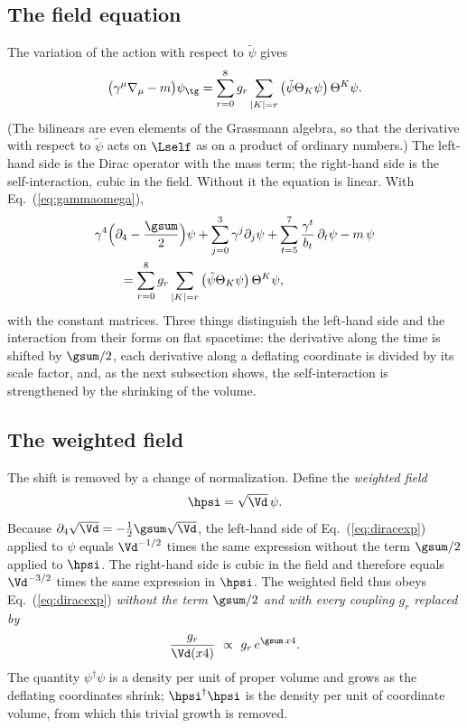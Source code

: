 \subsection{The field equation}

The variation of the action with respect to $\tilde\psi$ gives
\begin{equation}
\big(\gamma^{\mu}\nabla_\mu-m\big)\psi_{\tg}=\sum_{r=0}^{8}g_r\sum_{|K|=r}\big(\tilde\psi\Theta_K\psi\big)\,\Theta^{K}\psi .
\label{eq:dirac}
\end{equation}
(The bilinears are even elements of the Grassmann algebra, so that the derivative with respect to
$\tilde\psi$ acts on $\Lself$ as on a product of ordinary numbers.) The left-hand side is the Dirac
operator with the mass term; the right-hand side is the self-interaction, cubic in the field.
Without it the equation is linear. With Eq.~(\ref{eq:gammaomega}),
\begin{equation}
\begin{aligned}
&\gamma^{4}\Big(\partial_4-\frac{\gsum}{2}\Big)\psi+\sum_{j=0}^{3}\gamma^{j}\partial_j\psi
+\sum_{t=5}^{7}\frac{\gamma^{t}}{b_t}\,\partial_t\psi-m\,\psi\\
&\qquad=\sum_{r=0}^{8}g_r\sum_{|K|=r}\big(\tilde\psi\Theta_K\psi\big)\,\Theta^{K}\psi,
\end{aligned}
\label{eq:diracexp}
\end{equation}
with the constant matrices. Three things distinguish the left-hand side and the interaction from
their forms on flat spacetime: the derivative along the time is shifted by $\gsum/2$, each
derivative along a deflating coordinate is divided by its scale factor, and, as the next subsection
shows, the self-interaction is strengthened by the shrinking of the volume.

\subsection{The weighted field}

The shift is removed by a change of normalization. Define the \emph{weighted field}
\begin{equation}
\hpsi=\sqrt{\Vd}\,\psi .
\label{eq:weighted}
\end{equation}
Because $\partial_4\sqrt{\Vd}=-\tfrac12\gsum\sqrt{\Vd}$, the left-hand side of
Eq.~(\ref{eq:diracexp}) applied to $\psi$ equals $\Vd^{-1/2}$ times the same expression without the
term $\gsum/2$ applied to $\hpsi$. The right-hand side is cubic in the field and therefore equals
$\Vd^{-3/2}$ times the same expression in $\hpsi$. The weighted field thus obeys
Eq.~(\ref{eq:diracexp}) \emph{without the term $\gsum/2$ and with every coupling $g_r$ replaced by}
\begin{equation}
\frac{g_r}{\Vd(x4)}\ \propto\ g_r\,e^{\gsum\,x4} .
\label{eq:grun}
\end{equation}
The quantity $\psi^\dagger\psi$ is a density per unit of proper volume and grows as the deflating
coordinates shrink; $\hpsi^\dagger\hpsi$ is the density per unit of coordinate volume, from which
this trivial growth is removed.

